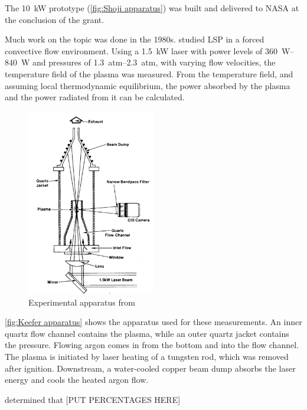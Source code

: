         The \qty{10}{kW} prototype (\autoref{fig:Shoji apparatus}) was built and delivered to NASA at the conclusion of the grant.

        Much work on the topic was done in the 1980s. \textcite{keeferPowerAbsorptionLasersustained1986a} studied LSP in a forced convective flow environment. Using a \qty{1.5}{kW}  laser with power levels of \qtyrange{360}{840}{W} and pressures of \qtyrange{1.3}{2.3}{atm}, with varying flow velocities, the temperature field of the plasma was measured. From the temperature field, and assuming local thermodynamic equilibrium, the power absorbed by the plasma and the power radiated from it can be calculated.
        \begin{figure}[!ht]
            \centering
            \includegraphics[width=0.5\textwidth]{assets/2 background/UTSI (Keefer) Apparatus.png}
            \caption{Experimental apparatus from \textcite{keeferPowerAbsorptionLasersustained1986a}}
            \label{fig:Keefer apparatus}
        \end{figure}
        \autoref{fig:Keefer apparatus} shows the apparatus used for these measurements. An inner quartz flow channel contains the plasma, while an outer quartz jacket contains the pressure. Flowing argon comes in from the bottom and into the flow channel. The plasma is initiated by laser heating of a tungsten rod, which was removed after ignition. Downstream, a water-cooled copper beam dump absorbs the laser energy and cools the heated argon flow.

         determined that [PUT PERCENTAGES HERE]


